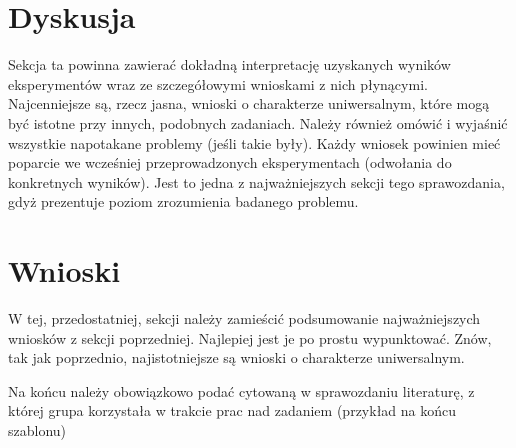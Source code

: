 \documentclass{classrep}
\begin{document}
\section{Dyskusja}
{\color{blue}
Sekcja ta powinna zawierać dokładną interpretację uzyskanych wyników
eksperymentów wraz ze szczegółowymi wnioskami z nich płynącymi. Najcenniejsze
są, rzecz jasna, wnioski o charakterze uniwersalnym, które mogą być istotne
przy innych, podobnych zadaniach. Należy również omówić i wyjaśnić wszystkie
napotakane problemy (jeśli takie były). Każdy wniosek powinien mieć poparcie
we wcześniej przeprowadzonych eksperymentach (odwołania do konkretnych
wyników). Jest to jedna z najważniejszych sekcji tego sprawozdania, gdyż
prezentuje poziom zrozumienia badanego problemu.}
\section{Wnioski}
{\color{blue}W tej, przedostatniej, sekcji należy zamieścić podsumowanie
najważniejszych wniosków z sekcji poprzedniej. Najlepiej jest je po prostu
wypunktować. Znów, tak jak poprzednio, najistotniejsze są wnioski o
charakterze uniwersalnym.}


\begin{thebibliography}{0}
\end{thebibliography}
{\color{blue} 
Na końcu należy obowiązkowo podać cytowaną w sprawozdaniu
literaturę, z której grupa korzystała w trakcie prac nad zadaniem (przykład na
końcu szablonu)}
\end{document}
